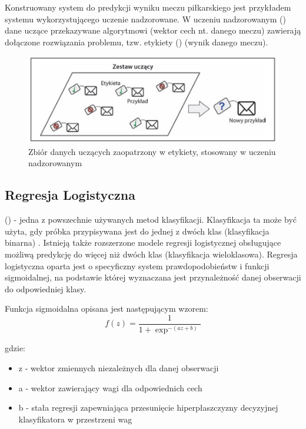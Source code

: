 Konstruowany system do predykcji wyniku meczu piłkarskiego jest przykładem systemu wykorzystującego uczenie nadzorowane. W uczeniu nadzorowanym () dane uczące przekazywane algorytmowi (wektor cech nt. danego meczu) zawierają dołączone rozwiązania problemu, tzw. etykiety () (wynik danego meczu). \cite{Geron}

\begin{figure}[h] 
        \includegraphics[width=15cm]{figures/supervised-learning.JPG}
        \caption{Zbiór danych uczących zaopatrzony w etykiety, stosowany w uczeniu nadzorowanym}
\end{figure}

\newpage

\subsection{Regresja Logistyczna}
 () - jedna z powszechnie używanych metod klasyfikacji. Klasyfikacja ta może być użyta, gdy próbka przypisywana jest do jednej z dwóch klas (klasyfikacja binarna) \cite{PPlonski}. Istnieją także rozszerzone modele regresji logistycznej obsługujące możliwą predykcję do więcej niż dwóch klas (klasyfikacja wieloklasowa). Regresja logistyczna oparta jest o specyficzny system prawdopodobieństw i funkcji sigmoidalnej, na podstawie której wyznaczana jest przynależność danej obserwacji do odpowiedniej klasy.

Funkcja sigmoidalna opisana jest następującym wzorem:
\begin{equation}
    f(z) = \frac{1}{1 + \exp^{-(az + b)}}
\end{equation}

gdzie:
\begin{itemize}
    \item z - wektor zmiennych niezależnych dla danej obserwacji
    \item a - wektor zawierający wagi dla odpowiednich cech
    \item b - stała regresji zapewniająca przesunięcie hiperpłaszczyzny decyzyjnej klasyfikatora w przestrzeni wag
\end{itemize}


